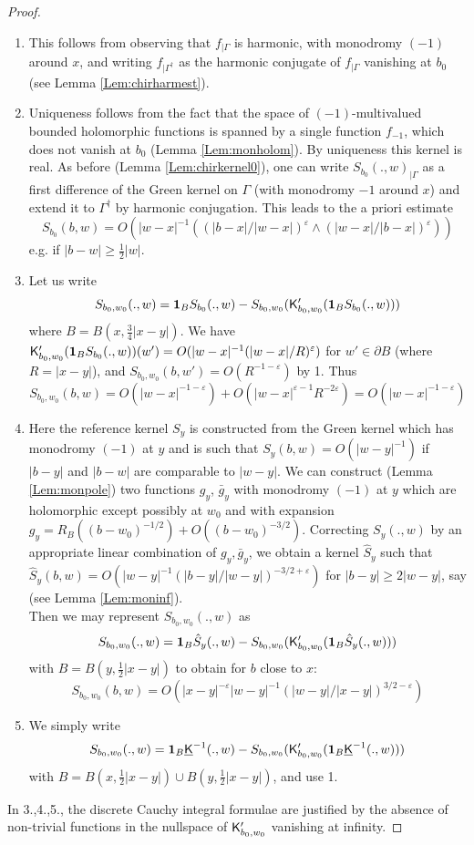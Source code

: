 \documentclass[10pt]{article}
\newcommand{\eps}{\varepsilon}
\newcommand{\ind}{{\bf 1}}
\newcommand{\rK}{{\sf K}}
\newcommand{\uK}{{\underline {\sf K}}}
\newcommand{\dg}{\dagger}
\begin{document}
\begin{proof}
\begin{enumerate}
\item This follows from observing that $f_{|\Gamma}$ is harmonic, with monodromy $(-1)$ around $x$, and writing $f_{|\Gamma^\dg}$ as the harmonic conjugate of $f_{|\Gamma}$ vanishing at $b_0$ (see Lemma \ref{Lem:chirharmest}).
\item Uniqueness follows from the fact that the space of $(-1)$-multivalued bounded holomorphic functions is spanned by a single function $f_{-1}$, which does not vanish at $b_0$ (Lemma \ref{Lem:monholom}). By uniqueness this kernel is real. 
As before (Lemma \ref{Lem:chirkernel0}), one can write $S_{b_0}(.,w)_{|\Gamma}$ as a first difference of the Green kernel on $\Gamma$ (with monodromy $-1$ around $x$) and extend it to $\Gamma^\dg$ by harmonic conjugation. This leads to the a priori estimate
$$S_{b_0}(b,w)=O(|w-x|^{-1}((|b-x|/|w-x|)^\eps\wedge(|w-x|/|b-x|)^\eps))$$
e.g. if $|b-w|\geq \frac 12|w|$.
\item Let us write 
$$S_{b_0,w_0}(.,w)=\ind_BS_{b_0}(.,w)-S_{b_0,w_0}(\rK'_{b_0,w_0}(\ind_BS_{b_0}(.,w)))$$
where $B=B(x,\frac 34|x-y|)$. We have $\rK'_{b_0,w_0}(\ind_B S_{b_0}(.,w))(w')=O(|w-x|^{-1}(|w-x|/R)^\eps)$ for $w'\in\partial B$ (where $R=|x-y|$), and $S_{b_0,w_0}(b,w')=O(R^{-1-\eps})$ by 1. Thus 
$$S_{b_0,w_0}(b,w)=O(|w-x|^{-1-\eps})+O(|w-x|^{\eps-1}R^{-2\eps})=O(|w-x|^{-1-\eps})$$
\item Here the reference kernel $S_y$ is constructed from the Green kernel which has monodromy $(-1)$ at $y$ and is such that $S_y(b,w)=O(|w-y|^{-1})$ if $|b-y|$ and $|b-w|$ are comparable to $|w-y|$. We can construct (Lemma \ref{Lem:monpole}) two functions $g_y$, $\bar g_y$ with monodromy $(-1)$ at $y$ which are holomorphic except possibly at $w_0$ and with expansion $g_y=R_B((b-w_0)^{-1/2})+O((b-w_0)^{-3/2})$. Correcting  $S_y(.,w)$ by an appropriate linear combination of $g_y,\bar g_y$, we obtain a kernel $\hat S_y$  such that $\hat S_y(b,w)=O(|w-y|^{-1}(|b-y|/|w-y|)^{-3/2+\eps})$ for $|b-y|\geq 2|w-y|$, say (see Lemma \ref{Lem:moninf}).\\
Then we may represent $S_{b_0,w_0}(.,w)$ as 
$$S_{b_0,w_0}(.,w)=\ind_B\hat S_y(.,w)-S_{b_0,w_0}(\rK'_{b_0,w_0}(\ind_B\hat S_y(.,w)))$$
with $B=B(y,\frac 12|x-y|)$ to obtain for $b$ close to $x$:
$$S_{b_0,w_0}(b,w)=O(|x-y|^{-\eps}|w-y|^{-1}(|w-y|/|x-y|)^{3/2-\eps})$$
\item We simply write
$$S_{b_0,w_0}(.,w)=\ind_B\uK^{-1}(.,w)-S_{b_0,w_0}(\rK'_{b_0,w_0}(\ind_B\uK^{-1}(.,w)))$$
with $B=B(x,\frac 12|x-y|)\cup B(y,\frac 12|x-y|)$, and use 1.
\end{enumerate}
In 3.,4.,5., the discrete Cauchy integral formulae are justified by the absence of non-trivial functions in the nullspace of $\rK'_{b_0,w_0}$ vanishing at infinity.
\end{proof}
\end{document}
